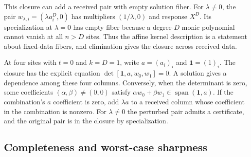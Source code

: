This closure can add a received pair with empty solution fiber. For
\(\lambda\ne0\), the pair \(w_{\lambda,i}=(\lambda a_i^D,0)\) has multipliers
\((1/\lambda,0)\) and response \(X^D\). Its specialization at \(\lambda=0\)
has empty fiber because a degree-\(D\) monic polynomial cannot vanish at all
\(n>D\) sites. Thus the affine kernel description is a statement about
fixed-data fibers, and elimination gives the closure across received data.

At four sites with \(t=0\) and \(k=D=1\), write \(a=(a_i)_i\) and
\(\mathbf 1=(1)_i\). The closure has the explicit equation
\(\det[\mathbf 1,a,w_0,w_1]=0\). A solution gives a dependence among these
four columns. Conversely, when the determinant is zero, some coefficients
\((\alpha,\beta)\ne(0,0)\) satisfy
\(\alpha w_0+\beta w_1\in\operatorname{span}(\mathbf 1,a)\).
If the combination's \(a\) coefficient is zero,
add \(\lambda a\) to a received column whose coefficient in the combination
is nonzero. For \(\lambda\ne0\) the perturbed pair admits a certificate,
and the original pair is in the closure by specialization.

\subsection{Completeness and worst-case sharpness}

